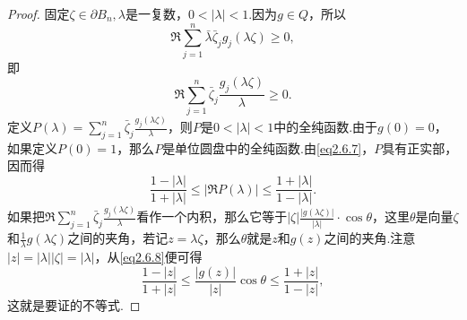 \begin{proof}
	固定$\zeta\in\partial B_n,\lambda$是一复数，$0<|\lambda|<1$.因为$g\in Q$，所以
	\[\Re\sum_{j=1}^{n}\bar{\lambda}\bar{\zeta}_jg_j(\lambda\zeta)\ge0,\]
	即
	\begin{equation}\label{eq2.6.7}
		\Re\sum_{j=1}^{n}\bar{\zeta}_j\frac{g_j(\lambda\zeta)}{\lambda}\ge0.
	\end{equation}
定义$P(\lambda)=\sum_{j=1}^{n}\bar{\zeta}_j\frac{g_j(\lambda\zeta)}{\lambda}$，则$P$是$0<|\lambda|<1$中的全纯函数.由于$g(0)=0$，如果定义$P(0)=1$，那么$P$是单位圆盘中的全纯函数.由\eqref{eq2.6.7}，$P$具有正实部，因而得
\begin{equation}\label{eq2.6.8}
	\frac{1-|\lambda|}{1+|\lambda|}\le|\Re P(\lambda)|\le\frac{1+|\lambda|}{1-|\lambda|}.
\end{equation}
如果把$\Re\sum_{j=1}^{n}\bar{\zeta}_j\frac{g_j(\lambda\zeta)}{\lambda}$看作一个内积，那么它等于$|\zeta|\frac{|g(\lambda\zeta)|}{|\lambda|}\cdot\cos\theta$，这里$\theta$是向量$\zeta$和$\frac1\lambda g(\lambda\zeta)$之间的夹角，若记$z=\lambda\zeta$，那么$\theta$就是$z$和$g(z)$之间的夹角.注意$|z|=|\lambda||\zeta|=|\lambda|$，从\eqref{eq2.6.8}便可得
\[\frac{1-|z|}{1+|z|}\le\frac{|g(z)|}{|z|}\cos\theta\le\frac{1+|z|}{1-|z|},\]
这就是要证的不等式.
\end{proof}
